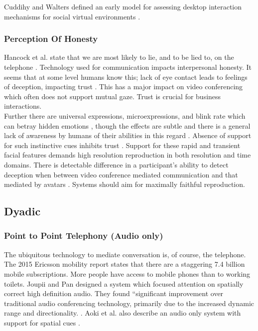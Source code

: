 Cuddihy and Walters defined an early model for assessing desktop interaction mechanisms for social virtual environments \cite{Cuddihy2000}.                               
\subsubsection{Perception Of Honesty}
Hancock et al. state that we are most likely to lie, and to be lied to, on the telephone \cite{Hancock2004}. Technology used for communication impacts interpersonal honesty. It seems that at some level humans know this; lack of eye contact leads to feelings of deception, impacting trust \cite{Holm2010}. This has a major impact on video conferencing which often does not support mutual gaze. Trust is crucial for business interactions.\\
Further there are universal expressions, microexpressions, and blink rate which can betray hidden emotions \cite{porter2008reading}, though the effects are subtle and there is a general lack of awareness by humans of their abilities in this regard \cite{Holm2010}. Absence of support for such instinctive cues inhibits trust \cite{Roberts2015}. Support for these rapid and transient facial features demands high resolution reproduction in both resolution and time domains. There is detectable difference in a participant's ability to detect deception when between video conference mediated communication and that mediated by avatars \cite{Steptoe2010b}. Systems should aim for maximally faithful reproduction. 
\subsection{Dyadic}
\subsubsection{Point to Point Telephony (Audio only)}
The ubiquitous technology to mediate conversation is, of course, the telephone. The 2015 Ericsson mobility report \cite{2015} states that there are a staggering 7.4 billion mobile subscriptions. More people have access to mobile phones than to working toilets. %
Joupii and Pan designed a system which focused attention on spatially correct high definition audio. They found ``significant improvement over traditional audio conferencing technology, primarily due to the increased dynamic range and directionality. \cite{jouppi2002mutually}. Aoki et al. also describe an audio only system with support for spatial cues \cite{Aoki2003}.
